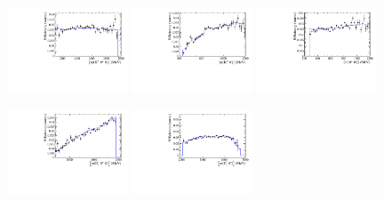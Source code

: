 \begin{figure}[h]
\centering
\includegraphics[height=!,width=0.32\textwidth]{figs/AcceptancePhspBDT/eff_Kpipi.pdf}
\includegraphics[height=!,width=0.32\textwidth]{figs/AcceptancePhspBDT/eff_Kpi.pdf}
\includegraphics[height=!,width=0.32\textwidth]{figs/AcceptancePhspBDT/eff_pipi.pdf}

\includegraphics[height=!,width=0.32\textwidth]{figs/AcceptancePhspBDT/eff_Dspipi.pdf}
\includegraphics[height=!,width=0.32\textwidth]{figs/AcceptancePhspBDT/eff_Dspi.pdf}


\end{figure}
